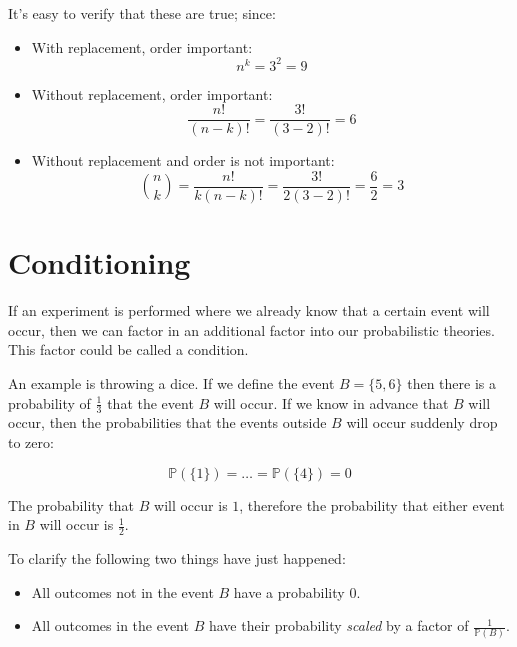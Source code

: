 It's easy to verify that these are true; since:

\begin{itemize}
	\item With replacement, order important:
	\begin{dmath}
		n^k = 3^2 = 9
	\end{dmath}
	\item Without replacement, order important:
	\begin{dmath}
		\frac{n!}{(n - k)!} = 	\frac{3!}{(3 - 2)!} = 6
	\end{dmath}
	\item Without replacement and order is not important:
	\begin{dmath}
		{n \choose k} = \frac{n!}{k(n - k)!} = \frac{3!}{2(3 - 2)!} = \frac{6}{2} = 3
	\end{dmath}

\end{itemize}



\section{Conditioning}

If an experiment is performed where we already know that a certain event will
occur, then we can factor in an additional factor into our probabilistic
theories. This factor could be called a condition.

An example is throwing a dice. If we define the event $B = \{5, 6\}$ then there
is a probability of $\frac{1}{3}$ that the event $B$ will occur. If we know in
advance that $B$ will occur, then the probabilities that the events outside $B$
will occur suddenly drop to zero:

\begin{dmath}
	{\mathbb{P}(\{1\}) = \dots = \mathbb{P}(\{4\}) = 0}
\end{dmath}

The probability that $B$ will occur is $1$, therefore the probability that
either event in $B$ will occur is $\frac{1}{2}$.

To clarify the following two things have just happened:

\begin{itemize}
	\item All outcomes not in the event $B$ have a probability $0$.
	\item All outcomes in the event $B$ have their probability {\it scaled} by a
	factor of $\frac{1}{\mathbb{P}(B)}$.
\end{itemize}

